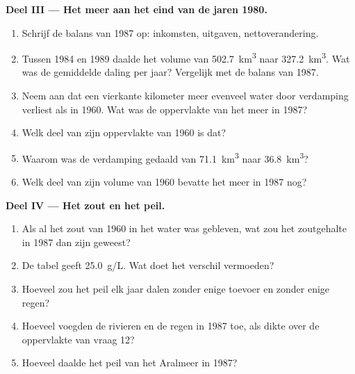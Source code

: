 \begin{problem}
\medskip
\noindent\textbf{Deel III --- Het meer aan het eind van de jaren 1980.}
\begin{enumerate}[resume]
  \item Schrijf de balans van 1987 op: inkomsten, uitgaven, nettoverandering.
  \item Tussen 1984 en 1989 daalde het volume van \qty{502.7}{km^3} naar
        \qty{327.2}{km^3}. Wat was de gemiddelde daling per jaar? Vergelijk met
        de balans van 1987.
  \item Neem aan dat een vierkante kilometer meer evenveel water door verdamping
        verliest als in 1960. Wat was de oppervlakte van het meer in 1987?
  \item Welk deel van zijn oppervlakte van 1960 is dat?
  \item Waarom was de verdamping gedaald van \qty{71.1}{km^3} naar
        \qty{36.8}{km^3}?
  \item Welk deel van zijn volume van 1960 bevatte het meer in 1987 nog?
\end{enumerate}

\medskip
\noindent\textbf{Deel IV --- Het zout en het peil.}
\begin{enumerate}[resume]
  \item Als al het zout van 1960 in het water was gebleven, wat zou het
        zoutgehalte in 1987 dan zijn geweest?
  \item De tabel geeft \qty{25.0}{g/L}. Wat doet het verschil vermoeden?
  \item Hoeveel zou het peil elk jaar dalen zonder enige toevoer en zonder
        enige regen?
  \item Hoeveel voegden de rivieren en de regen in 1987 toe, als dikte over de
        oppervlakte van vraag 12?
  \item Hoeveel daalde het peil van het Aralmeer in 1987?
\end{enumerate}
\end{problem}
